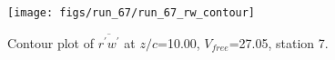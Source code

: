 \begin{figure}[H]
\centering
\texttt{[image: figs/run\_67/run\_67\_rw\_contour]}
\caption{Contour plot of $\overline{r^\prime w^\prime}$ at $z/c$=10.00, $V_{free}$=27.05, station 7.}
\end{figure}


